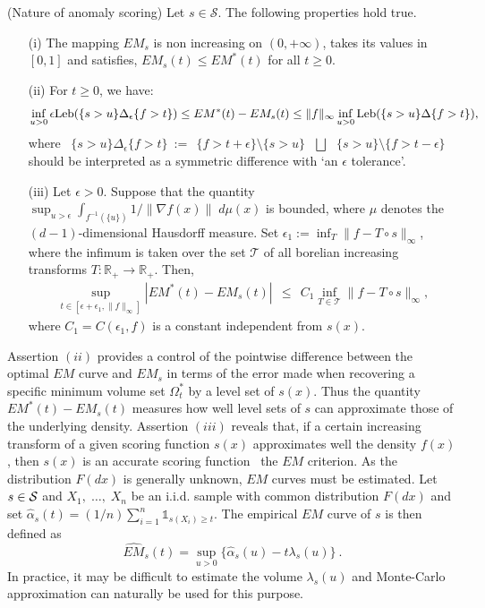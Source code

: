 \begin{proposition}
\label{aistat:propestim} ({\sc Nature of anomaly scoring}) Let $s \in \mathcal{S}$. The following properties hold true.
\begin{enumerate}
\item[(i)] The mapping $EM_s$ is non increasing on $(0,+\infty)$, takes its values in $[0,1]$ and satisfies,
$EM_s(t) \le EM^*(t)$ for all $t\geq 0$. 
\item[(ii)]  For $t \ge 0$, we have: 
$$\inf_{u>0} \epsilon \leb (\{ s >u\}\Delta_\epsilon \{f>t\}) \le EM^*(t)-EM_s(t) \le \|f\|_\infty \inf_{u>0} \leb (\{ s >u\}\Delta\{f>t\}),$$
%
where ~$\{ s >u\}\Delta_\epsilon \{f>t\} ~:=~~ \{f>t+\epsilon\} \setminus \{ s >u\} ~~~\bigsqcup~~~ \{ s >u\} \setminus \{f>t-\epsilon\}$ should be interpreted as a symmetric difference with `an $\epsilon$ tolerance'.
\item[(iii)] Let $\epsilon >0$. Suppose that the quantity $\sup_{u>\epsilon}
  \int_{f^{-1}(\{u\})} 1/\|\nabla f(x)\|\;  d\mu(x) $ is bounded,
  where $\mu$ denotes the $(d-1)$-dimensional Hausdorff measure. Set $\epsilon_1 := \inf_{T} \|f-T\circ s\|_\infty$, where the infimum is taken over the set $\mathcal{T}$ of all borelian increasing transforms $T : \mathbb{R}_+ \rightarrow \mathbb{R}_+$. Then, 
\begin{align*}
\sup_{t\in[\epsilon + \epsilon_1,\|f\|_\infty]}|EM^*(t)-EM_s(t)| ~~\le~~  C_1 \inf_{T  \in \mathcal{T}} \|f-T\circ s\|_\infty,
\end{align*}
where $C_1=C(\epsilon_1,f)$ is a constant independent from $s(x)$.
\end{enumerate}
\end{proposition}

Assertion $(ii)$ provides a control of the pointwise difference between the
optimal $EM$ curve and $EM_s$ in terms of the error made when recovering a specific minimum volume set $\Omega_t^*$ by a level set of $s(x)$. Thus the quantity $EM^*(t)-EM_s(t)$ measures how well level sets of $s$ can approximate those of the underlying density.
Assertion $(iii)$ reveals that, if a certain increasing transform of a given scoring function $s(x)$ approximates well the density $f(x)$, then $s(x)$ is an accurate scoring function \wrt~the $EM$ criterion. %
As the distribution $F(dx)$ is generally unknown, $EM$ curves must be estimated. Let $s\in \S$ and $X_1,\; \ldots,\; X_n$ be an i.i.d. sample with common distribution $F(dx)$ and set $\widehat{\alpha}_s(t)=(1/n)\sum_{i=1}^n\mathds{1}_{s(X_i)\geq t}$. The empirical $EM$ curve of $s$ is then defined as $$\widehat{EM}_s(t)=\sup_{u>0}\{ \widehat{\alpha}_s(u)-t\lambda_s(u)\}~.$$ In practice, it may be difficult to estimate the volume $\lambda_s(u)$ and Monte-Carlo approximation can naturally be used for this purpose.



